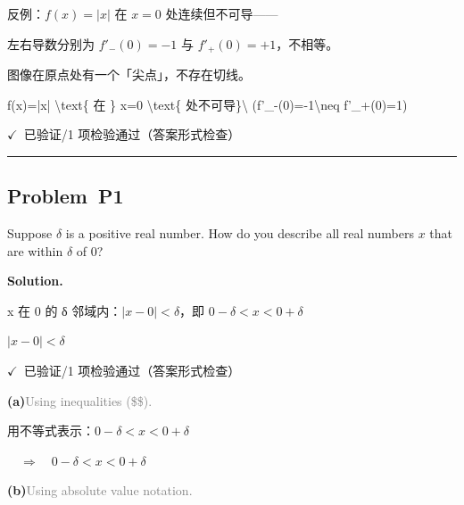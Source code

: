 \documentclass[12pt, a4paper]{article}
\newcommand{\problem}[1]{\subsection*{Problem~#1}}
\newcommand{\solution}{%
  \par\noindent
  {\color{solutiongreen}\bfseries Solution.}\par
}
\newcommand{\verifyok}{\textcolor{solutiongreen}{\ensuremath{\checkmark}\ 已验证}}
\begin{document}
\begin{stepbox}
反例：$f(x)=|x|$ 在 $x=0$ 处连续但不可导——
\end{stepbox}

\begin{stepbox}
左右导数分别为 $f'_-(0) = -1$ 与 $f'_+(0) = +1$，不相等。
\end{stepbox}

\begin{stepbox}
图像在原点处有一个「尖点」，不存在切线。
\end{stepbox}

\begin{center}
f(x)=|x| \textbackslash{}text\{ 在 \} x=0 \textbackslash{}text\{ 处不可导\}\textbackslash{} (f'\_-(0)=-1\textbackslash{}neq f'\_+(0)=1)
\end{center}

\begin{verifybox}\small \verifyok{}/1 项检验通过（答案形式检查） \end{verifybox}

\vspace{0.8em}\hrule\vspace{0.8em}

\problem{P1}

\begin{stepbox}
Suppose $\delta$ is a positive real number. How do you describe all real numbers $x$ that are within $\delta$ of 0?
\end{stepbox}

\solution

\begin{stepbox}
x 在 0 的 δ 邻域内：$|x - 0| < \delta$，即 $0-\delta < x < 0+\delta$
\end{stepbox}

\begin{center}
$\boxed{|x - 0| < \delta}$
\end{center}

\begin{verifybox}\small \verifyok{}/1 项检验通过（答案形式检查） \end{verifybox}

\vspace{0.3em}
\textbf{(a)}\quad \textcolor{gray}{\small Using inequalities (\$<, >\$).}

用不等式表示：$0 - \delta < x < 0 + \delta$

$\quad\Rightarrow\quad 0 - \delta < x < 0 + \delta$

\textbf{(b)}\quad \textcolor{gray}{\small Using absolute value notation.}
\end{document}

